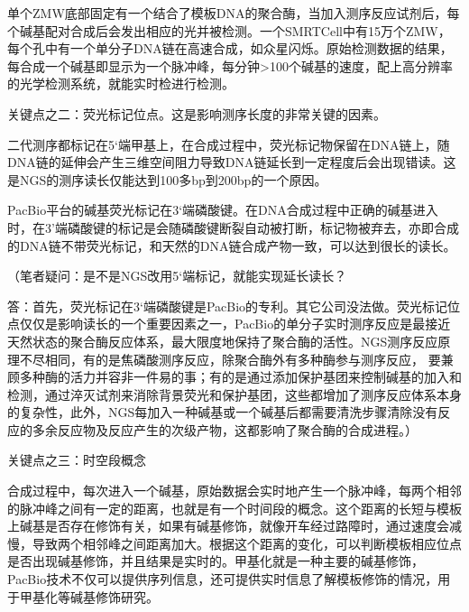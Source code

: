 单个ZMW底部固定有一个结合了模板DNA的聚合酶，当加入测序反应试剂后，每个碱基配对合成后会发出相应的光并被检测。一个SMRTCell中有15万个ZMW，每个孔中有一个单分子DNA链在高速合成，如众星闪烁。原始检测数据的结果，每合成一个碱基即显示为一个脉冲峰，每分钟>100个碱基的速度，配上高分辨率的光学检测系统，就能实时检进行检测。









关键点之二：荧光标记位点。这是影响测序长度的非常关键的因素。

二代测序都标记在5‘端甲基上，在合成过程中，荧光标记物保留在DNA链上，随DNA链的延伸会产生三维空间阻力导致DNA链延长到一定程度后会出现错读。这是NGS的测序读长仅能达到100多bp到200bp的一个原因。

PacBio平台的碱基荧光标记在3‘端磷酸键。在DNA合成过程中正确的碱基进入时，在3’端磷酸键的标记是会随磷酸键断裂自动被打断，标记物被弃去，亦即合成的DNA链不带荧光标记，和天然的DNA链合成产物一致，可以达到很长的读长。

（笔者疑问：是不是NGS改用5‘端标记，就能实现延长读长？

答：首先，荧光标记在3‘端磷酸键是PacBio的专利。其它公司没法做。荧光标记位点仅仅是影响读长的一个重要因素之一，PacBio的单分子实时测序反应是最接近天然状态的聚合酶反应体系，最大限度地保持了聚合酶的活性。NGS测序反应原理不尽相同，有的是焦磷酸测序反应，除聚合酶外有多种酶参与测序反应， 要兼顾多种酶的活力并容非一件易的事；有的是通过添加保护基团来控制碱基的加入和检测，通过淬灭试剂来消除背景荧光和保护基团，这些都增加了测序反应体系本身的复杂性，此外，NGS每加入一种碱基或一个碱基后都需要清洗步骤清除没有反应的多余反应物及反应产生的次级产物，这都影响了聚合酶的合成进程。）

关键点之三：时空段概念

合成过程中，每次进入一个碱基，原始数据会实时地产生一个脉冲峰，每两个相邻的脉冲峰之间有一定的距离，也就是有一个时间段的概念。这个距离的长短与模板上碱基是否存在修饰有关，如果有碱基修饰，就像开车经过路障时，通过速度会减慢，导致两个相邻峰之间距离加大。根据这个距离的变化，可以判断模板相应位点是否出现碱基修饰，并且结果是实时的。甲基化就是一种主要的碱基修饰，PacBio技术不仅可以提供序列信息，还可提供实时信息了解模板修饰的情况，用于甲基化等碱基修饰研究。

